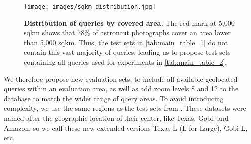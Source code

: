 \begin{figure}
    \begin{center}
    \texttt{[image: images/sqkm\_distribution.jpg]}
    \end{center}
    \vspace{-5mm}
    \caption{\textbf{Distribution of queries by covered area.} The red mark at 5,000 sqkm shows that 78\% of astronaut photographs cover an area lower than 5,000 sqkm. Thus, the test sets in \cref{tab:main_table_1} do not contain this vast majority of queries, leading us to propose test sets containing all queries used for experiments in \cref{tab:main_table_2}.}
    \vspace{-5mm}
    \label{fig:sqkm_distribution}
\end{figure}
We therefore propose new evaluation sets, to include all available geolocated queries within an evaluation area, as well as add zoom levels 8 and 12 to the database to match the wider range of query areas.
To avoid introducing complexity, we use the same regions as the test sets from \cite{Berton_2024_EarthLoc}. These datasets were named after the geographic location of their center, like Texas, Gobi, and Amazon, so we call these new extended versions Texas-L (L for Large), Gobi-L, etc.
